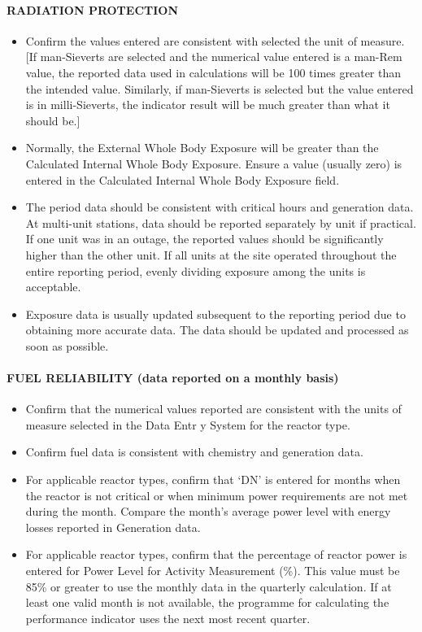 \paragraph{RADIATION PROTECTION}
\begin{itemize}
\item Confirm the values entered are consistent with selected the unit of
measure.  [If man-Sieverts are selected and the numerical value entered
is a man-Rem value, the reported data used in calculations will be 100
times greater than the intended value. Similarly, if man-Sieverts is
selected but the value entered is in milli-Sieverts, the indicator result will
be much greater than what it should be.]
\item Normally, the External Whole Body Exposure will be greater than the
Calculated Internal Whole Body Exposure. Ensure a value (usually zero)
is entered in the Calculated Internal Whole Body Exposure field.
\item The period data should be consistent with critical hours and generation
data. At multi-unit stations, data should be reported separately by unit if
practical. If one unit was in an outage, the reported values should be
significantly higher than the other unit. If all units at the site operated
throughout the entire reporting period, evenly dividing exposure among
the units is acceptable.
\item Exposure data is usually updated subsequent to the reporting period due
to obtaining more accurate data. The data should be updated and
processed as soon as possible.
\end{itemize}

\paragraph{FUEL RELIABILITY (data reported on a monthly basis)}
\begin{itemize}
\item Confirm that the numerical values reported are consistent
 with the units of measure selected in the Data Entr
y System for the reactor type.
\item Confirm fuel data is consistent with chemistry and generation data.
\item For applicable reactor types, confirm that ‘DN’ is entered for months when
the reactor is not critical or when minimum power requirements are not
met during the month. Compare the month’s average power level with
energy losses reported in Generation data.
\item For applicable reactor types, confirm that the percentage
of reactor power is entered for Power Level for Activity Measurement (\%). This value must
be 85\% or greater to use the monthly data in the quarterly calculation. If at
least one valid month is not available, the programme for calculating the
performance indicator uses the next most recent quarter.
\end{itemize}

